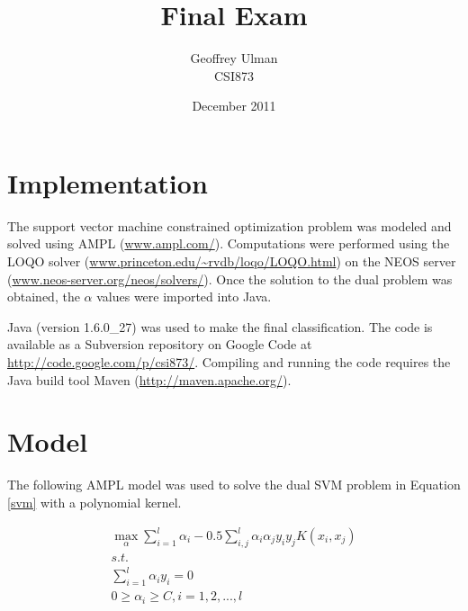 \documentclass{article}
\begin{document}
\title{Final Exam}
\author{Geoffrey Ulman\\
        CSI873}
\date{December 2011}
\maketitle

\section{Implementation}\label{Implementation}

The support vector machine constrained optimization problem was modeled and solved using AMPL (\url{www.ampl.com/}). Computations were performed using the LOQO solver (\url{www.princeton.edu/~rvdb/loqo/LOQO.html}) on the NEOS server (\url{www.neos-server.org/neos/solvers/}). Once the solution to the dual problem was obtained, the \(\alpha\) values were imported into Java.

Java (version 1.6.0\_27) was used to make the final classification. The code is available as a Subversion repository on Google Code at \url{http://code.google.com/p/csi873/}. Compiling and running the code requires the Java build tool Maven (\url{http://maven.apache.org/}).

\section{Model}\label{Model}

The following AMPL model was used to solve the dual SVM problem in Equation \ref{svm} with a polynomial kernel.

\begin{equation}\label{svm}
\begin{split}
\max_\alpha \sum_{i=1}^l \alpha_i - 0.5 \sum_{i,j}^l \alpha_i \alpha_j y_i y_j K \left( x_i , x_j \right) \\
s.t. \\
\sum_{i=1}^l \alpha_i y_i = 0 \\
0 \ge \alpha_i \ge C , i = 1,2,...,l
\end{split}
\end{equation}
\end{document}
